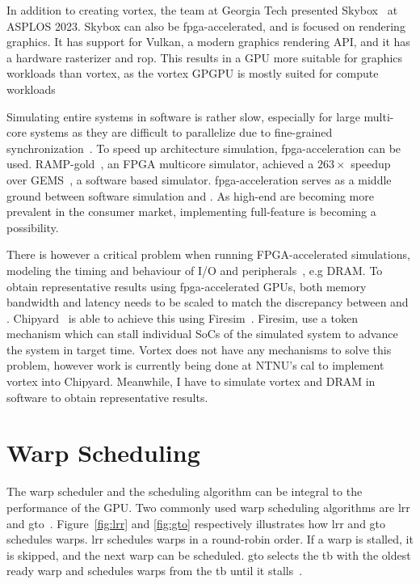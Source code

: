 In addition to creating \Gls{vortex}, the team at Georgia Tech presented Skybox~\cite{skybox} at ASPLOS 2023. Skybox can also be \Gls{fpga}-accelerated, and is focused on rendering graphics. It has support for Vulkan, a modern graphics rendering API, and it has a hardware rasterizer and \acrfull{rop}. This results in a GPU more suitable for graphics workloads than \Gls{vortex}, as the \Gls{vortex} GPGPU is mostly suited for compute workloads  

Simulating entire systems in software is rather slow, especially for large multi-core systems as they are difficult to parallelize due to fine-grained synchronization~\cite{graphite, wwt2}. To speed up architecture simulation, \acrshort{fpga}-acceleration can be used. RAMP-gold~\cite{RAMP-gold}, an FPGA multicore simulator, achieved a $263\times$ speedup over GEMS~\cite{gems}, a software based simulator. \acrshort{fpga}-acceleration serves as a middle ground between software simulation and . As high-end  are becoming more prevalent in the consumer market, implementing full-feature  is becoming a possibility.

There is however a critical problem when running FPGA-accelerated simulations, modeling the timing and behaviour of I/O and peripherals~\cite{chipyard}, e.g DRAM. To obtain representative results using \acrshort{fpga}-accelerated GPUs, both memory bandwidth and latency needs to be scaled to match the discrepancy between  and . Chipyard~\cite{chipyard} is able to achieve this using Firesim~\cite{firesim}. Firesim, use a token mechanism which can stall individual SoCs of the simulated system to advance the system in target time. Vortex does not have any mechanisms to solve this problem, however work is currently being done at NTNU's \acrfull{cal} to implement \Gls{vortex} into Chipyard. Meanwhile, I have to simulate \Gls{vortex} and DRAM in software to obtain representative results.

\section{Warp Scheduling} \label{sec:warp_scheduling}

The warp scheduler and the scheduling algorithm can be integral to the performance of the GPU. Two commonly used warp scheduling algorithms are \acrfull{lrr} and \acrfull{gto}~\cite{improving_gpgpu_scheduling}. Figure~\ref{fig:lrr} and \ref{fig:gto} respectively illustrates how \acrshort{lrr} and \acrshort{gto} schedules warps. \acrshort{lrr} schedules warps in a round-robin order. If a warp is stalled, it is skipped, and the next warp can be scheduled. \acrshort{gto} selects the \acrshort{tb} with the oldest ready warp and schedules warps from the \acrshort{tb} until it stalls~\cite{cache-conscious_wavefront_scheduling}. 

